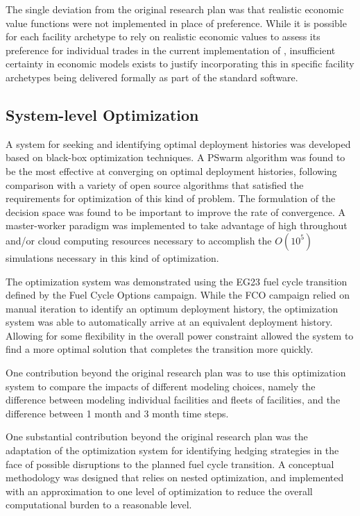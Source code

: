 The single deviation from the original research plan was that realistic
economic value functions were not implemented in place of preference.  While
it is possible for each facility archetype to rely on realistic economic
values to assess its preference for individual trades in the current
implementation of \Cyclus{}, insufficient certainty in economic models exists
to justify incorporating this in specific facility archetypes being delivered
formally as part of the standard software.

\subsection{System-level Optimization}

A system for seeking and identifying optimal deployment histories was
developed based on black-box optimization techniques.  A PSwarm algorithm was
found to be the most effective at converging on optimal deployment histories,
following comparison with a variety of open source algorithms that satisfied
the requirements for optimization of this kind of problem.  The formulation of
the decision space was found to be important to improve the rate of
convergence.  A master-worker paradigm was implemented to take advantage of
high throughout and/or cloud computing resources necessary to accomplish the
$O(10^5)$ \Cyclus{} simulations necessary in this kind of optimization.

The optimization system was demonstrated using the EG23 fuel cycle transition
defined by the Fuel Cycle Options campaign.  While the FCO campaign relied on
manual iteration to identify an optimum deployment history, the optimization
system was able to automatically arrive at an equivalent deployment history.
Allowing for some flexibility in the overall power constraint allowed the
system to find a more optimal solution that completes the transition more
quickly.

One contribution beyond the original research plan was to use this
optimization system to compare the impacts of different modeling choices,
namely the difference between modeling individual facilities and fleets of
facilities, and the difference between 1 month and 3 month time
steps.

One substantial contribution beyond the original research plan was the
adaptation of the optimization system for identifying hedging strategies in
the face of possible disruptions to the planned fuel cycle transition.  A
conceptual methodology was designed that relies on nested optimization, and
implemented with an approximation to one level of optimization to reduce the
overall computational burden to a reasonable level.






